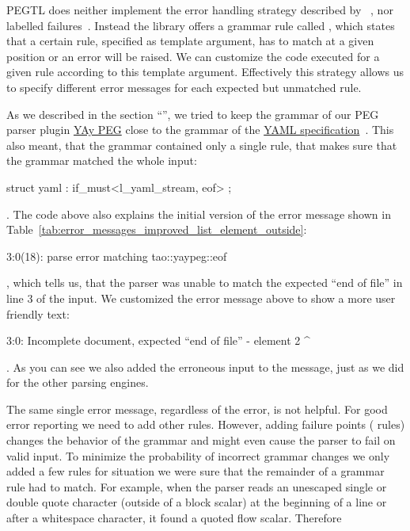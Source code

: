 PEGTL does neither implement the error handling strategy described by \citeauthor{ford2002packrat}~\cite{ford2002packrat}, nor labelled failures~\cite{maidl2016labeled}. Instead the library offers a grammar rule called , which states that a certain rule, specified as template argument, has to match at a given position or an error will be raised. We can customize the code executed for a given  rule according to this template argument. Effectively this strategy allows us to specify different error messages for each expected but unmatched rule.

As we described in the section “”, we tried to keep the grammar of our PEG parser plugin \href{https://libelektra.org/plugins/yaypeg}{YAy PEG} close to the grammar of the \href{http://yaml.org/spec/1.2/spec}{YAML specification}~\cite{ben2009yaml}. This also meant, that the grammar contained only a single  rule, that makes sure that the grammar matched the whole input:

\begin{cppcode}
  struct yaml : if_must<l_yaml_stream, eof> {};
\end{cppcode}

. The code above also explains the initial version of the error message shown in Table~\ref{tab:error_messages_improved_list_element_outside}:

\begin{textcode}
  3:0(18): parse error matching tao::yaypeg::eof
\end{textcode}

, which tells us, that the parser was unable to match the expected “end of file” in line 3 of the input. We customized the error message above to show a more user friendly text:

\begin{textcode}
  3:0: Incomplete document, expected “end of file”
       - element 2
       ^
\end{textcode}

. As you can see we also added the erroneous input to the message, just as we did for the other parsing engines.

The same single error message, regardless of the error, is not helpful. For good error reporting we need to add other  rules. However, adding failure points ( rules) changes the behavior of the grammar and might even cause the parser to fail on valid input. To minimize the probability of incorrect grammar changes we only added a few rules for situation we were sure that the remainder of a grammar rule had to match. For example, when the parser reads an unescaped single or double quote character (outside of a block scalar) at the beginning of a line or after a whitespace character, it found a quoted flow scalar. Therefore

